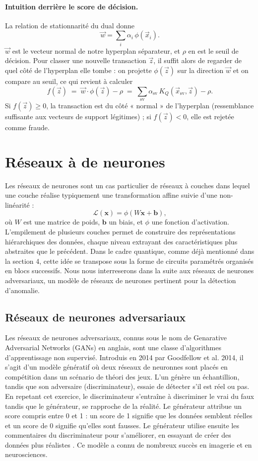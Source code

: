 \documentclass[a4paper]{article}
\begin{document}
\paragraph{Intuition derrière le score de décision.} La relation de stationnarité du dual donne
\[
\vec{w} = \sum_{i} \alpha_i\, \phi(\vec{x}_i).
\]
$\vec{w}$ est le vecteur normal de notre hyperplan séparateur, et $\rho$ en est le seuil de décision. Pour classer une nouvelle transaction $\vec{z}$, il suffit alors de regarder de quel côté de l'hyperplan elle tombe : on projette $\phi(\vec{z})$ sur la direction $\vec{w}$ et on compare au seuil, ce qui revient à calculer
\[
f(\vec{z}) \;=\; \vec{w} \cdot \phi(\vec{z}) - \rho \;=\; \sum_{\text{sv}} \alpha_{\text{sv}}\, K_Q(\vec{x}_{\text{sv}}, \vec{z}) - \rho.
\]
Si $f(\vec{z}) \geq 0$, la transaction est du côté « normal » de l'hyperplan (ressemblance suffisante aux vecteurs de support légitimes) ; si $f(\vec{z}) < 0$, elle est rejetée comme fraude.

\section{Réseaux à de neurones}

Les réseaux de neurones sont un cas particulier de réseaux à couches dans lequel une couche réalise typiquement une transformation affine suivie d’une non-linéarité :
\[
\mathcal{L}(\mathbf{x}) = \phi(W\mathbf{x} + \mathbf{b}),
\]
où $W$ est une matrice de poids, $\mathbf{b}$ un biais, et $\phi$ une fonction d’activation. L’empilement de plusieurs couches permet de construire des représentations hiérarchiques des données, chaque niveau extrayant des caractéristiques plus abstraites que le précédent.
Dans le cadre quantique, comme déjà mentionné dans la section 4, cette idée se transpose sous la forme de circuits paramétrés organisés en blocs successifs. Nous nous interreserons dans la suite aux réseaux de neurones adversariaux, un modèle de réseaux de neurones pertinent pour la détection d'anomalie.

\subsection{Réseaux de neurones adversariaux}

Les réseaux de neurones adversariaux, connus sous le nom de Genarative Adversarial Networks (GANs) en anglais, sont une classe d'algorithmes d'apprentissage non supervisé. Introduis en 2014 par Goodfellow et al. 2014, il s'agit d'un modèle génératif où deux réseaux de neuronnes sont placés en compétition dans un scénario de théori des jeux. L'un génère un échantillion, tandis que son adversaire (discriminateur), essaie de détecter s'il est réel ou pas. En repetant cet exercice, le discriminateur s'entraîne à discriminer le vrai du faux tandis que le générateur, se rapproche de la réalité. Le générateur attribue un score compris entre 0 et 1 : un score de 1 signifie que les données semblent réelles et un score de 0 signifie qu’elles sont fausses.
Le générateur utilise ensuite les commentaires du discriminateur pour s’améliorer, en essayant de créer des données plus réalistes \cite{DanielGANs}. 
Ce modèle a connu de nombreux succès en imagerie et en neurosciences.  
\end{document}
